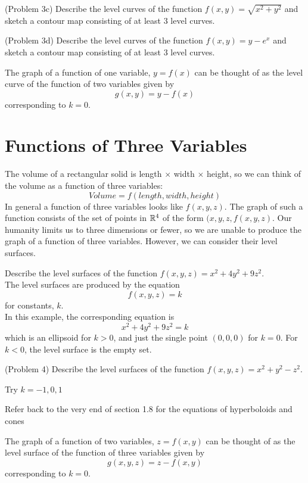 \documentclass[handout]{ximera}
\begin{document}
\begin{problem}(Problem 3c)
Describe the level curves of the function $f(x, y) = \sqrt{x^2 + y^2}$ and sketch a contour map consisting of at least 3 level curves.\\
\end{problem}

\begin{problem}(Problem 3d)
Describe the level curves of the function $f(x,y) = y - e^x$ and sketch a contour map consisting of at least 3 level curves.\\
\end{problem}

\begin{remark}
The graph of a function of one variable, $y= f(x)$ can be thought of as the level curve of the function of two variables given by 
\[
g(x, y) = y-f(x)
\]
corresponding to $k = 0$.
\end{remark}

\section{Functions of Three Variables}
The volume of a rectangular solid is length $\times$ width $\times $ height, so we can think of the volume as a function of three variables:
\[
Volume = f(length, width, height)
\]
In general a function of three variables looks like $f(x, y, z)$.
The graph of such a function consists of the set of points in $\mathbb R^4$ of the form $(x, y, z, f(x, y, z)$.
Our humanity limits us to three dimensions or fewer, so we are unable to produce the graph of a function of three variables.
However, we can consider their level surfaces.

\begin{example}[Example 4]
Describe the level surfaces of the function $f(x, y, z) = x^2 + 4y^2 + 9 z^2$.\\
The level surfaces are produced by the equation
\[
f(x, y, z) = k
\]
for constants, $k$.\\
In this example, the corresponding equation is
\[
x^2 + 4y^2 + 9z^2 = k
\]
which is an ellipsoid for $k >0$, and just the single point $(0, 0, 0)$ for $k = 0$.
For $k<0$, the level surface is the empty set.
\end{example}

\begin{problem}(Problem 4)
Describe the level surfaces of the function $f(x, y, z) = x^2 + y^2 - z^2$.\\
\begin{hint}
Try $k = -1, 0, 1$
\end{hint}
\begin{hint}
Refer back to the very end of section 1.8 for the equations of hyperboloids and cones
\end{hint}
\end{problem}

\begin{remark}
The graph of a function of two variables, $z= f(x,y)$ can be thought of as the level surface of the function of three variables given by 
\[
g(x, y, z) = z-f(x,y)
\]
corresponding to $k = 0$.
\end{remark}
\end{document}
